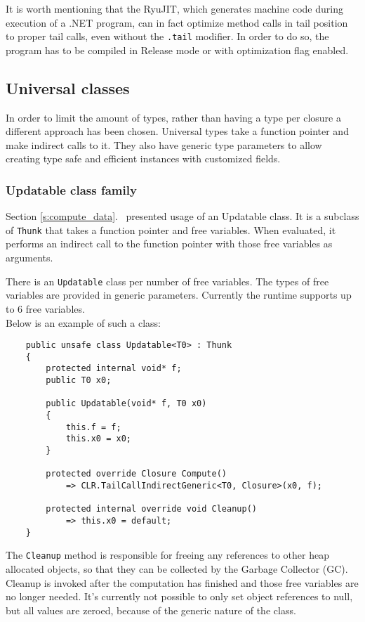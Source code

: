 \documentclass[en]{pracamgr}
\newcommand{\myref}[1]{\ref{#1}.~\nameref{#1}}
\begin{document}
It is worth mentioning that the RyuJIT, which generates
machine code during execution of a .NET program,
can in fact optimize method calls in tail position
to proper tail calls, even without the \texttt{.tail}
modifier. In order to do so, the program has to be compiled
in Release mode or with optimization flag enabled.

\subsection{Universal classes}

In order to limit the amount of types, rather than having
a type per closure a different approach has been chosen.
Universal types take a function pointer and make
indirect calls to it.
They also have generic type parameters to allow creating
type safe and efficient instances with customized fields.


\subsubsection{Updatable class family}\label{s:updatables}

Section \myref{s:compute_data} presented usage of an Updatable class.
It is a subclass of \texttt{Thunk} that takes a function
pointer and free variables. When evaluated, it performs an
indirect call to the function pointer with those free variables as arguments.

There is an \texttt{Updatable} class per number of free variables. The types of free variables are provided in generic parameters. Currently the runtime supports up to 6
free variables.
\\ Below is an example of such a class:

\begin{verbatim}
    public unsafe class Updatable<T0> : Thunk
    {
        protected internal void* f;
        public T0 x0;

        public Updatable(void* f, T0 x0)
        {
            this.f = f;
            this.x0 = x0;
        }

        protected override Closure Compute()
            => CLR.TailCallIndirectGeneric<T0, Closure>(x0, f);
        
        protected internal override void Cleanup()
            => this.x0 = default;
    }
\end{verbatim}

The \texttt{Cleanup} method is responsible for freeing
any references to other heap allocated objects, so that
they can be collected by the Garbage Collector (GC).
Cleanup is invoked after the computation has finished
and those free variables are no longer needed.
It's currently not possible to only set object references to null,
but all values are zeroed, because of the generic nature
of the class.
\end{document}
